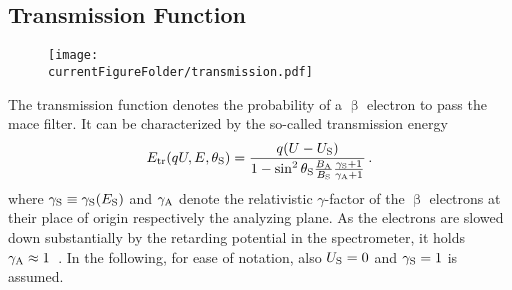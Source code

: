 \subsection{Transmission Function}
\label{sec:intSpecModelResponseTransmission}
\begin{figure}
	\centering
	\texttt{[image: \\currentFigureFolder/transmission.pdf]}
	\label{fig:intSpecModelTransmission}
\end{figure}
The transmission function denotes the probability of a $\upbeta$ electron to pass the \gls{mace} filter. It can be characterized by the so-called transmission energy~\cite{Groh2015}
\begin{equation}
\label{eq:intSpecModelTransmissionEnergy}
E_\mathrm{tr}(qU,E,\theta_\mathrm{S}) = 
\frac{
	q(U-U_\mathrm{S})
}{
	1-\sin^2\theta_\mathrm{S} \frac{B_\mathrm{A}}{B_\mathrm{S}} \frac{\gamma_\mathrm{S}+1}{\gamma_\mathrm{A}+1}
}
\text{\,.}
\end{equation}
where $\gamma_\mathrm{S}\equiv\gamma_\mathrm{S}(E_\mathrm{S})$ and $\gamma_\mathrm{A}$ denote the relativistic $\gamma$-factor of the $\upbeta$ electrons at their place of origin respectively the analyzing plane. As the electrons are slowed down substantially by the retarding potential in the spectrometer, it holds $\gamma_\mathrm{A}\approx1$~\cite{Groh2015}. In the following, for ease of notation, also $U_\mathrm{S}=0$ and $\gamma_\mathrm{S}=1$ is assumed.

